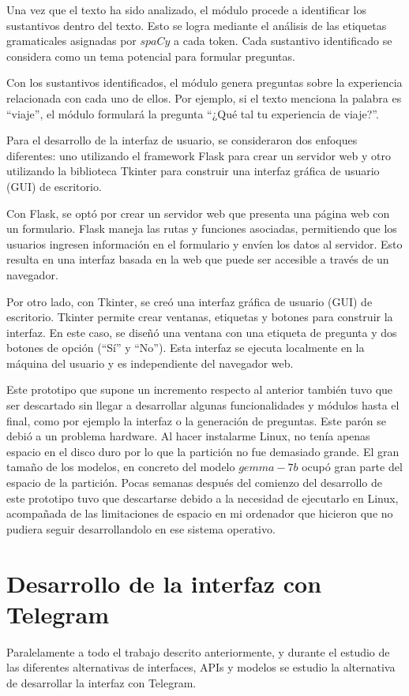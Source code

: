 Una vez que el texto ha sido analizado, el módulo procede a identificar los sustantivos dentro del texto. Esto se logra mediante el análisis de las etiquetas gramaticales asignadas por $spaCy$ a cada token. Cada sustantivo identificado se considera como un tema potencial para formular preguntas.

Con los sustantivos identificados, el módulo genera preguntas sobre la experiencia relacionada con cada uno de ellos. Por ejemplo, si el texto menciona la palabra es ``viaje'', el módulo formulará la pregunta ``¿Qué tal tu experiencia de viaje?''.

Para el desarrollo de la interfaz de usuario, se consideraron dos enfoques diferentes: uno utilizando el framework Flask para crear un servidor web y otro utilizando la biblioteca Tkinter para construir una interfaz gráfica de usuario (GUI) de escritorio.

Con Flask, se optó por crear un servidor web que presenta una página web con un formulario. Flask maneja las rutas y funciones asociadas, permitiendo que los usuarios ingresen información en el formulario y envíen los datos al servidor. Esto resulta en una interfaz basada en la web que puede ser accesible a través de un navegador.

Por otro lado, con Tkinter, se creó una interfaz gráfica de usuario (GUI) de escritorio. Tkinter permite crear ventanas, etiquetas y botones para construir la interfaz. En este caso, se diseñó una ventana con una etiqueta de pregunta y dos botones de opción (``Sí'' y ``No''). Esta interfaz se ejecuta localmente en la máquina del usuario y es independiente del navegador web.

Este prototipo que supone un incremento respecto al anterior también tuvo que ser descartado sin llegar a desarrollar algunas funcionalidades y módulos hasta el final, como por ejemplo la interfaz o la generación de preguntas. Este parón se debió a un problema hardware. Al hacer instalarme Linux, no tenía apenas espacio en el disco duro por lo que la partición no fue demasiado grande. El gran tamaño de los modelos, en concreto del modelo $gemma-7b$ ocupó gran parte del espacio de la partición. Pocas semanas después del comienzo del desarrollo de este prototipo tuvo que descartarse debido a la necesidad de ejecutarlo en Linux, acompañada de las limitaciones de espacio en mi ordenador que hicieron que no pudiera seguir desarrollandolo en ese sistema operativo. 

\section{Desarrollo de la interfaz con Telegram}
\label{sec:RASA}
Paralelamente a todo el trabajo descrito anteriormente, y durante el estudio de las diferentes alternativas de interfaces, APIs y modelos se estudio la alternativa de desarrollar la interfaz con Telegram. 


